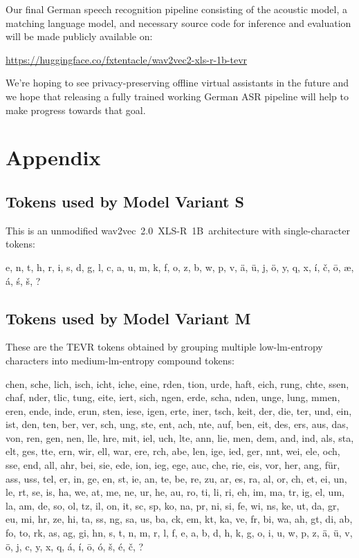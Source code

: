 Our final German speech recognition pipeline consisting of the acoustic model, a matching language model, and necessary source code for inference and evaluation will be made publicly available on:

\url{https://huggingface.co/fxtentacle/wav2vec2-xls-r-1b-tevr}

We're hoping to see privacy-preserving offline virtual assistants in the future and we hope that releasing a fully trained working German ASR pipeline will help to make progress towards that goal.

\newpage
\section{Appendix}

\subsection{Tokens used by Model Variant S}
This is an unmodified wav2vec~2.0~XLS-R~1B~architecture with single-character tokens:

e, n, t, h, r, i, s, d, g, l, c, a, u, m, k, f, o, z, b, w, p, v, ä, ü, j, ö, y, q, x, í, č, ō, æ, á, ś, š, ?

\subsection{Tokens used by Model Variant M}
These are the TEVR tokens obtained by grouping multiple low-lm-entropy characters into medium-lm-entropy compound tokens:

chen, sche, lich, isch, icht, iche, eine, rden, tion, urde, haft, eich, rung, chte, ssen, chaf, nder, tlic, tung, eite, iert, sich, ngen, erde, scha, nden, unge, lung, mmen, eren, ende, inde, erun, sten, iese, igen, erte, iner, tsch, keit, der, die, ter, und, ein, ist, den, ten, ber, ver, sch, ung, ste, ent, ach, nte, auf, ben, eit, des, ers, aus, das, von, ren, gen, nen, lle, hre, mit, iel, uch, lte, ann, lie, men, dem, and, ind, als, sta, elt, ges, tte, ern, wir, ell, war, ere, rch, abe, len, ige, ied, ger, nnt, wei, ele, och, sse, end, all, ahr, bei, sie, ede, ion, ieg, ege, auc, che, rie, eis, vor, her, ang, für, ass, uss, tel, er, in, ge, en, st, ie, an, te, be, re, zu, ar, es, ra, al, or, ch, et, ei, un, le, rt, se, is, ha, we, at, me, ne, ur, he, au, ro, ti, li, ri, eh, im, ma, tr, ig, el, um, la, am, de, so, ol, tz, il, on, it, sc, sp, ko, na, pr, ni, si, fe, wi, ns, ke, ut, da, gr, eu, mi, hr, ze, hi, ta, ss, ng, sa, us, ba, ck, em, kt, ka, ve, fr, bi, wa, ah, gt, di, ab, fo, to, rk, as, ag, gi, hn, s, t, n, m, r, l, f, e, a, b, d, h, k, g, o, i, u, w, p, z, ä, ü, v, ö, j, c, y, x, q, á, í, ō, ó, š, é, č, ?

